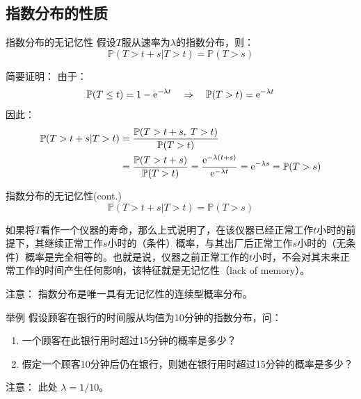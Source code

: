 \documentclass[t]{beamer}
\renewcommand{\Pr}{\mathbb{P}}
\begin{document}
\subsection{指数分布的性质}
\begin{frame}{指数分布的无记忆性}
    假设$T$服从速率为$\lambda$的指数分布，则：
\begin{equation*}
	{\Pr(T>t+s|T>t)}={\Pr(T>s)} 
\end{equation*}

\begin{block}{简要证明：}
    由于：
    \[\Pr(T\le t)=1-{\rm e}^{-\lambda t}\quad\Rightarrow\quad \Pr(T>t)={\rm e}^{-\lambda t} \]	
    因此：
    \[\begin{split}
    {\Pr(T>t+s|T>t)}&=\frac{\Pr(T>t+s,\;T>t)}{\Pr(T>t)}\\
    &=\frac{\Pr(T>t+s)}{\Pr(T>t)}=\frac{{\rm e}^{-\lambda(t+s)}}{{\rm e}^{-\lambda t}}={\rm e}^{-\lambda s}={\Pr(T>s)}
    \end{split}\]
\end{block}

\end{frame}


\begin{frame}{指数分布的无记忆性(cont.)}
    \[	{\Pr(T>t+s|T>t)}={\Pr(T>s)} 
    \]

    如果将$T$看作一个仪器的寿命，那么上式说明了，在该仪器已经正常工作$t$小时的前提下，其继续正常工作$s$小时的（条件）概率，与其出厂后正常工作$s$小时的（无条件）概率是完全相等的。也就是说，仪器之前正常工作的$t$小时，不会对其未来正常工作的时间产生任何影响，该特征就是无记忆性（lack of memory）。
    
    \begin{block}{注意：}
指数分布是唯一具有无记忆性的连续型概率分布。
    \end{block}
   
\end{frame}


\begin{frame}{举例}
    假设顾客在银行的时间服从均值为10分钟的指数分布，问：
\begin{enumerate}
\item 一个顾客在此银行用时超过15分钟的概率是多少？
\item 假定一个顾客10分钟后仍在银行，则她在银行用时超过15分钟的概率是多少？
\end{enumerate}

\begin{block}{注意：}
   此处 $\lambda=1/10$。
\end{block}

\end{frame}
\end{document}
